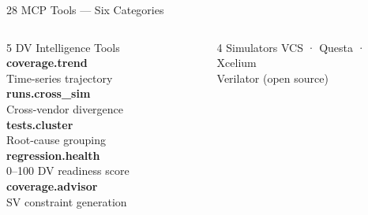 \documentclass[aspectratio=169,t]{beamer}
\begin{document}
\begin{frame}{28 MCP Tools — Six Categories}
\begin{columns}[T]
      \begin{alertblock}{5 DV Intelligence Tools}
        \footnotesize
        \vspace{0.1em}
        \textbf{coverage.trend}\\
        Time-series trajectory\\[2pt]
        \textbf{runs.cross\_sim}\\
        Cross-vendor divergence\\[2pt]
        \textbf{tests.cluster}\\
        Root-cause grouping\\[2pt]
        \textbf{regression.health}\\
        0--100 DV readiness score\\[2pt]
        \textbf{coverage.advisor}\\
        SV constraint generation
      \end{alertblock}
      \vspace{0.2em}
      \begin{exampleblock}{4 Simulators}
        \footnotesize
        VCS · Questa · Xcelium\\
        Verilator (open source)
      \end{exampleblock}
  \end{columns}
\end{frame}
\end{document}
